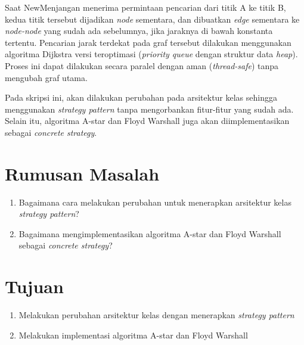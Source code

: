 \documentclass[a4paper,twoside]{article}
\begin{document}
	Saat NewMenjangan menerima permintaan pencarian dari titik A ke titik B, kedua titik tersebut dijadikan \textit{node} sementara, dan dibuatkan \textit{edge} sementara ke \textit{node-node} yang sudah ada sebelumnya, jika jaraknya di bawah konstanta tertentu. Pencarian jarak terdekat pada graf tersebut dilakukan menggunakan algoritma Dijkstra versi teroptimasi (\textit{priority queue} dengan struktur data \textit{heap}). Proses ini dapat dilakukan secara paralel dengan aman (\textit{thread-safe}) tanpa mengubah graf utama.

	Pada skripsi ini, akan dilakukan perubahan pada arsitektur kelas sehingga menggunakan \textit{strategy pattern} tanpa mengorbankan fitur-fitur yang sudah ada. Selain itu, algoritma A-star dan Floyd Warshall juga akan diimplementasikan sebagai \textit{concrete strategy}.
	
	\section{Rumusan Masalah}
            \begin{enumerate}
                \item Bagaimana cara melakukan perubahan untuk menerapkan arsitektur kelas \textit{strategy pattern}?
                \item Bagaimana mengimplementasikan algoritma A-star dan Floyd Warshall sebagai \textit{concrete strategy}?
            \end{enumerate}
	
	\section{Tujuan}
            \begin{enumerate}
                \item Melakukan perubahan arsitektur kelas dengan menerapkan \textit{strategy pattern}
                \item Melakukan implementasi algoritma A-star dan Floyd Warshall
            \end{enumerate}
	
\end{document}
